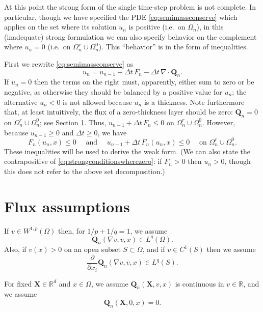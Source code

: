 \documentclass[final,leqno,onefignum,onetabnum]{siamltex1213bueler}
\newcommand\bQ{\mathbf{Q}}
\newcommand\bX{\mathbf{X}}
\newcommand{\Div}{\nabla\cdot}
\renewcommand{\grad}{\nabla}
\newcommand\RR{\mathbb{R}}
\begin{document}
At this point the strong form of the single time-step problem is not complete.  In particular, though we have specified the PDE \eqref{eq:semimassconserve} which applies on the set where its solution $u_n$ is positive (i.e.~on $\Omega_n$), in this (inadequate) strong formulation we can also specify behavior on the complement where $u_n=0$ (i.e.~on $\Omega_n^r \cup \Omega_n^0$).  This ``behavior'' is in the form of inequalities.

First we rewrite \eqref{eq:semimassconserve} as
    $$u_n = u_{n-1} + \Delta t\, F_n - \Delta t\, \Div \bQ_n.$$
If $u_n=0$ then the terms on the right must, apparently, either sum to zero or be negative, as otherwise they should be balanced by a positive value for $u_n$; the alternative $u_n<0$ is not allowed because $u_n$ is a thickness.  Note furthermore that, at least intuitively, the flux of a zero-thickness layer should be zero: $\bQ_n=0$ on $\Omega_n^r \cup \Omega_n^0$; see Section \ref{sec:fluxassumptions}.  Thus, $u_{n-1}+\Delta t\, F_n \le 0$ on $\Omega_n^r \cup \Omega_n^0$.  However, because $u_{n-1}\ge 0$ and $\Delta t\ge 0$, we have
\begin{equation}
F_n(u_n,x) \le 0 \quad \text{ and } \quad u_{n-1} + \Delta t\, F_n(u_n,x) \le 0 \quad \text{ on } \Omega_n^r \cup \Omega_n^0. \label{eq:strongconditionswherezero}
\end{equation}
These inequalities will be used to derive the weak form.  (We can also state the contrapositive of \eqref{eq:strongconditionswherezero}: if $F_n>0$ then $u_n>0$, though this does not refer to the above set decomposition.)


\section{Flux assumptions} \label{sec:fluxassumptions}

If $v \in W^{1,p}(\Omega)$ then, for $1/p + 1/q = 1$, we assume
\begin{equation}
\bQ_n(\grad v,v,x) \in L^q(\Omega). \label{eq:QisLq}
\end{equation}
Also, if $v(x)>0$ on an open subset $S\subset \Omega$, and if $v\in C^1(S)$ then we assume
\begin{equation}
\frac{\partial}{\partial x_i} \bQ_n(\grad v,v,x) \in L^q(S). \label{eq:Qissmooth}
\end{equation}

For fixed $\bX\in\RR^d$ and $x\in \Omega$, we assume $\bQ_n(\bX,v,x)$ is continuous in $v\in\RR$, and we assume
\begin{equation}
\bQ_n(\bX,0,x)=0. \label{eq:Qiszero}
\end{equation}
\end{document}
